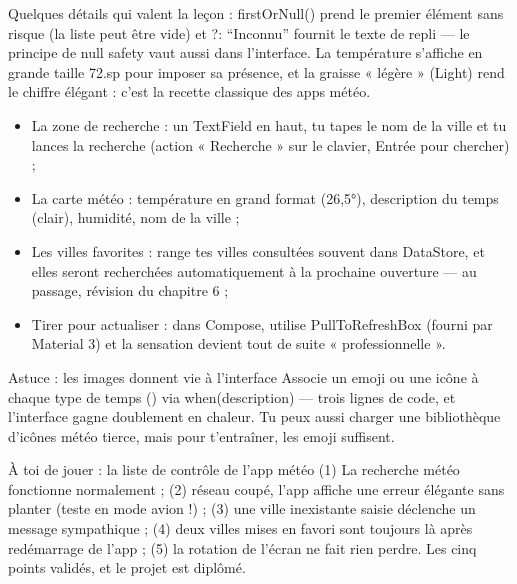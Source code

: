 Quelques détails qui valent la leçon : firstOrNull() prend le premier élément sans risque (la liste peut être vide) et ?: “Inconnu” fournit le texte de repli — le principe de null safety vaut aussi dans l'interface. La température s'affiche en grande taille 72.sp pour imposer sa présence, et la graisse « légère » (Light) rend le chiffre élégant : c'est la recette classique des apps météo.



\begin{itemize}
  \item La zone de recherche : un TextField en haut, tu tapes le nom de la ville et tu lances la recherche (action « Recherche » sur le clavier, Entrée pour chercher) ;
  \item La carte météo : température en grand format (26,5°), description du temps (clair), humidité, nom de la ville ;
  \item Les villes favorites : range tes villes consultées souvent dans DataStore, et elles seront recherchées automatiquement à la prochaine ouverture — au passage, révision du chapitre 6 ;
  \item Tirer pour actualiser : dans Compose, utilise PullToRefreshBox (fourni par Material 3) et la sensation devient tout de suite « professionnelle ».
\end{itemize}

\begin{tcbinfo}{Astuce : les images donnent vie à l’interface}
Associe un emoji ou une icône à chaque type de temps () via when(description) — trois lignes de code, et l’interface gagne doublement en chaleur. Tu peux aussi charger une bibliothèque d’icônes météo tierce, mais pour t’entraîner, les emoji suffisent.

\end{tcbinfo}

\begin{tcbpractice}{À toi de jouer : la liste de contrôle de l’app météo}
(1) La recherche météo fonctionne normalement ; (2) réseau coupé, l’app affiche une erreur élégante sans planter (teste en mode avion !) ; (3) une ville inexistante saisie déclenche un message sympathique ; (4) deux villes mises en favori sont toujours là après redémarrage de l’app ; (5) la rotation de l’écran ne fait rien perdre. Les cinq points validés, et le projet est diplômé.

\end{tcbpractice}

